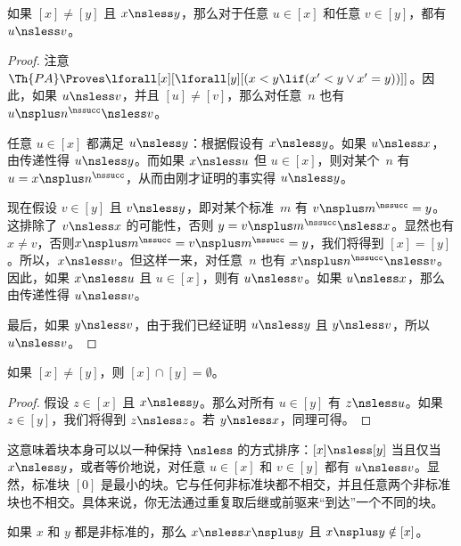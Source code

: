 \documentclass[../../../include/open-logic-section]{subfiles}
\begin{document}
\begin{prop}
如果 $[x] \neq [y]$ 且 $x \nsless y$，那么对于任意 $u \in [x]$ 和任意 $v \in [y]$，都有 $u \nsless v$。
\end{prop}

\begin{proof}
注意$\Th{PA} \Proves \lforall[x][\lforall[y][(x < y \lif (x' < y
    \lor x' = y))]]$。因此，如果 $u \nsless v$，并且 $[u] \neq [v]$，那么对任意~$n$ 也有 $u \nsplus n^\nssucc \nsless v$。

任意 $u \in [x]$ 都满足 $u \nsless y$：根据假设有 $x \nsless y$。如果 $u \nsless x$，由传递性得 $u \nsless y$。而如果 $x \nsless u$ 但 $u \in [x]$，则对某个~$n$ 有 $u = x\nsplus n^\nssucc$，从而由刚才证明的事实得 $u \nsless y$。

现在假设 $v \in [y]$ 且 $v \nsless y$，即对某个标准~$m$ 有 $v \nsplus m^\nssucc = y$。这排除了 $v \nsless x$ 的可能性，否则 $y = v \nsplus m^\nssucc \nsless x$。显然也有 $x \neq v$，否则$x \nsplus m^\nssucc = v \nsplus m^\nssucc = y$，我们将得到 $[x] = [y]$。所以，$x \nsless v$。但这样一来，对任意~$n$ 也有 $x \nsplus n^\nssucc \nsless v$。因此，如果 $x \nsless u$ 且 $u \in [x]$，则有 $u \nsless v$。如果 $u \nsless x$，那么由传递性得 $u \nsless v$。

最后，如果 $y \nsless v$，由于我们已经证明 $u \nsless y$ 且 $y \nsless v$，所以 $u \nsless v$。
\end{proof}

\begin{cor}
如果 $[x] \neq [y]$，则 $[x] \cap [y] = \emptyset$。
\end{cor}

\begin{proof}
假设 $z \in [x]$ 且 $x \nsless y$。那么对所有 $u \in [y]$ 有 $z \nsless u$。如果 $z \in [y]$，我们将得到 $z \nsless z$。若 $y \nsless x$，同理可得。
\end{proof}

\begin{explain}
这意味着块本身可以以一种保持 $\nsless$ 的方式排序：$[x] \nsless [y]$ 当且仅当 $x \nsless y$，或者等价地说，对任意 $u \in [x]$ 和 $v \in [y]$ 都有 $u \nsless v$。显然，标准块 $[0]$ 是最小的块。它与任何非标准块都不相交，并且任意两个非标准块也不相交。具体来说，你无法通过重复取后继或前驱来“到达”一个不同的块。
\end{explain}

\begin{prop}
如果 $x$ 和 $y$ 都是非标准的，那么 $x \nsless x \nsplus y$ 且 $x \nsplus y \notin [x]$。
\end{prop}
\end{document}
